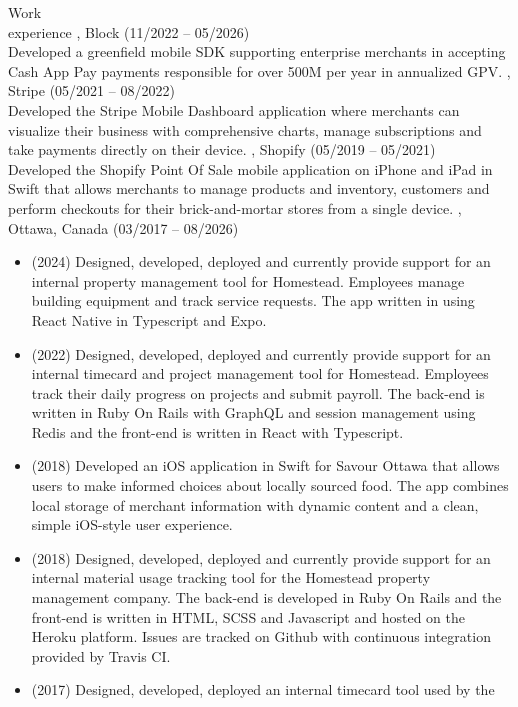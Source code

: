 \documentclass{resume}
\begin{document}
\begin{category}{Work \\experience}
, Block (11/2022 -- 05/2026)\\
Developed a greenfield mobile SDK supporting enterprise merchants in accepting Cash App
Pay payments responsible for over 500M per year in annualized GPV.
, Stripe (05/2021 -- 08/2022)\\
Developed the Stripe Mobile Dashboard application where merchants can visualize their business
with comprehensive charts, manage subscriptions and take payments
directly on their device.
, Shopify (05/2019 -- 05/2021)\\
Developed the Shopify Point Of Sale mobile application on iPhone and iPad in Swift that
allows merchants to manage products and inventory, customers and perform checkouts for
their brick-and-mortar stores from a single device.
, Ottawa, Canada (03/2017 -- 08/2026)
\begin{itemize}
  \item (2024) Designed, developed, deployed and currently provide support for an internal
    property management tool for Homestead. Employees manage building equipment and track
    service requests. The app written in using React Native in Typescript and Expo.
  \item (2022) Designed, developed, deployed and currently provide support for an internal
    timecard and project management tool for Homestead. Employees track their daily progress
    on projects and submit payroll. The back-end is written in Ruby On Rails with GraphQL and
    session management using Redis and the front-end is written in React with Typescript.
  \item (2018) Developed an iOS application in Swift for Savour Ottawa that allows
    users to make informed choices about locally sourced food. The app combines
    local storage of merchant information with dynamic content and a clean,
    simple iOS-style user experience.
  \item (2018) Designed, developed, deployed and currently provide support for an
    internal material usage tracking tool for the Homestead property management
    company. The back-end is developed in Ruby On Rails and the front-end is written
    in HTML, SCSS and Javascript and hosted on the Heroku platform. Issues are tracked
    on Github with continuous integration provided by Travis CI.
  \item (2017) Designed, developed, deployed an internal timecard tool used by the

\end{itemize}
\end{category}
\end{document}
